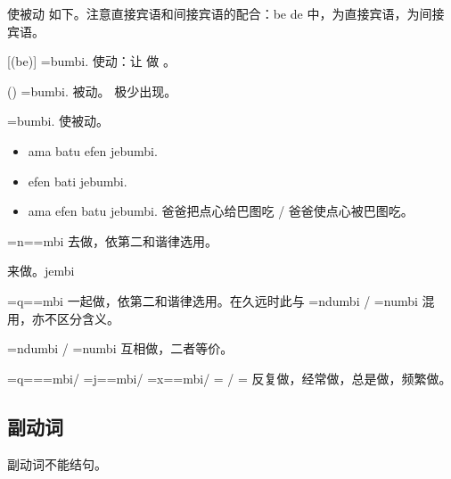 \begin{des}
    \item[使被动] 如下。注意直接宾语和间接宾语的配合：\A \B be \C de 中，\B 为直接宾语，\C 为间接宾语。
    \begin{des}
        \item[\A \B \bil{be}{让} {[\C (be)]} \V=bumbi.] 使动：\A 让 \B 做 \V \C 。
        \item[\A \B \bil{de}{被} (\C) \V=bumbi.] 被动。 \C 极少出现。
        \item[\A \B \bil{be}{让 / 把} \C \bil{de}{被 / 给} \V=bumbi.] 使被动。
    \end{des}
    \begin{itemize}
        \item ama batu  efen jebumbi.
        \item efen bati  jebumbi.
        \item ama efen  batu  jebumbi. 爸爸把点心给巴图吃 / 爸爸使点心被巴图吃。
    \end{itemize}
    \item[\V=n=\AIImedi=mbi] 去做\V ，依第二和谐律选用。
    \item[\V \bil{='jimbi}{\lat{-njimbi}}] 来做\V 。\irg jembi
    \item[\V=q=\AIImedi=mbi] 一起做\V ，依第二和谐律选用。在久远时此与 \V=ndumbi / \V=numbi 混用，亦不区分含义。
    \item[\V=ndumbi / \V=numbi] 互相做\V ，二者等价。
    \item[\V=q==\AIImedi =mbi/ \V=j=\AIImedi =mbi/ \V=x=\AIImedi =mbi/ \V=\ii{=tambi}{=tembi}{=tombi} / \V=\ii{=dambi}{=dembi}{=dombi}] 反复做\V ，经常做\V ，总是做\V ，频繁做\V 。
\end{des}

\subsection{副动词}

副动词不能结句。

